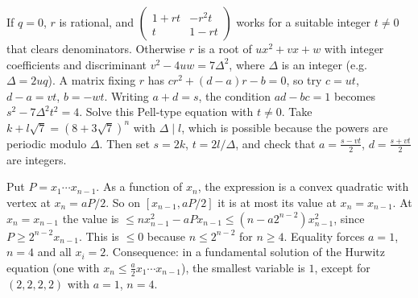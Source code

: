 \documentclass[11pt,a4paper]{article}
\begin{document}
 If $q=0$, $r$ is rational, and $\begin{pmatrix}1+rt&-r^2t\\t&1-rt\end{pmatrix}$ works for a suitable integer $t\ne0$ that clears denominators. Otherwise $r$ is a root of $ux^2+vx+w$ with integer coefficients and discriminant $v^2-4uw=7\Delta^2$, where $\Delta$ is an integer (e.g.\ $\Delta=2uq$).
 A matrix fixing $r$ has $cr^2+(d-a)r-b=0$, so try $c=ut$, $d-a=vt$, $b=-wt$. Writing $a+d=s$, the condition $ad-bc=1$ becomes $s^2-7\Delta^2t^2=4$.
 Solve this Pell-type equation with $t\ne0$. Take $k+l\sqrt7=(8+3\sqrt7)^n$ with $\Delta\mid l$, which is possible because the powers are periodic modulo $\Delta$. Then set $s=2k$, $t=2l/\Delta$, and check that $a=\frac{s-vt}2$, $d=\frac{s+vt}2$ are integers.

 Put $P=x_1\cdots x_{n-1}$. As a function of $x_n$, the expression is a convex quadratic with vertex at $x_n=aP/2$. So on $[x_{n-1},aP/2]$ it is at most its value at $x_n=x_{n-1}$.
 At $x_n=x_{n-1}$ the value is $\le nx_{n-1}^2-aPx_{n-1}\le(n-a2^{n-2})x_{n-1}^2$, since $P\ge2^{n-2}x_{n-1}$. This is $\le0$ because $n\le2^{n-2}$ for $n\ge4$.
 Equality forces $a=1$, $n=4$ and all $x_i=2$. Consequence: in a fundamental solution of the Hurwitz equation (one with $x_n\le\frac a2x_1\cdots x_{n-1}$), the smallest variable is $1$, except for $(2,2,2,2)$ with $a=1$, $n=4$.
\end{document}
